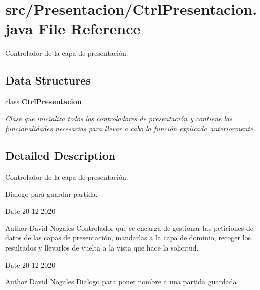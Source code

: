 \section{src/\+Presentacion/\+Ctrl\+Presentacion.java File Reference}
\label{_ctrl_presentacion_8java}


Controlador de la capa de presentación.  


\subsection*{Data Structures}
\begin{DoxyCompactItemize}
\item 
class \textbf{ Ctrl\+Presentacion}
\begin{DoxyCompactList}\small\item\em Clase que inicializa todos los controladores de presentación y contiene las funcionalidades necesarias para llevar a cabo la función explicada anteriormente. \end{DoxyCompactList}\end{DoxyCompactItemize}


\subsection{Detailed Description}
Controlador de la capa de presentación. 

Dialogo para guardar partida.

\begin{DoxyDate}{Date}
20-\/12-\/2020 
\end{DoxyDate}
\begin{DoxyAuthor}{Author}
David Nogales Controlador que se encarga de gestionar las peticiones de datos de las capas de presentación, mandarlas a la capa de dominio, recoger los resultados y llevarlos de vuelta a la vista que hace la solicitud.
\end{DoxyAuthor}
\begin{DoxyDate}{Date}
20-\/12-\/2020 
\end{DoxyDate}
\begin{DoxyAuthor}{Author}
David Nogales Dialogo para poner nombre a una partida guardada 
\end{DoxyAuthor}
